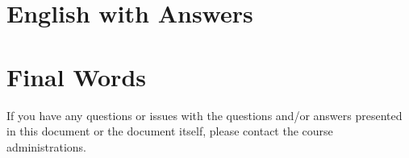 \documentclass[a4paper,11pt,oneside]{article}
\begin{document}
\begin{sloppypar}

\section{English with Answers}
\label{englishWithAnswers}










\section{Final Words}
\label{finalWords}
If you have any questions or issues with the questions and/or answers presented in this document or the document itself, please contact the course administrations.

\pagebreak


\end{sloppypar}
\end{document}
